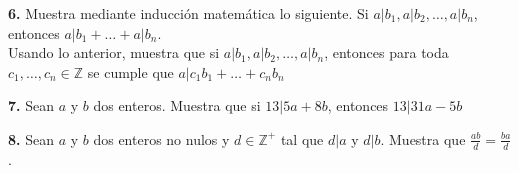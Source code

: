 \documentclass[12pt]{article}
\begin{document}
%
%
\textbf{6.} Muestra mediante inducción matemática lo siguiente. Si $a | b_1, a | b_2, \dots, a | b_n$, entonces $a | b_1 + \dots + a | b_n$.\\

Usando lo anterior, muestra que si $a | b_1, a | b_2, \dots, a | b_n$, entonces para toda $c_1, \dots, c_n \in \mathbb{Z}$ se cumple que $a | c_1b_1 + \dots + c_nb_n$
\vspace{1cm}

%
%
\textbf{7.} Sean $a$ y $b$ dos enteros. Muestra que si $13 | 5a + 8b$, entonces $13|31a - 5b$\\

\vspace{1cm}

%
%
\textbf{8.} Sean $a$ y $b$ dos enteros no nulos y $d \in \mathbb{Z}^+$ tal que $d | a$ y $d | b$. Muestra que $\frac{ab}{d} = \frac{ba}{d}$.

\vspace{1cm}
\end{document}
